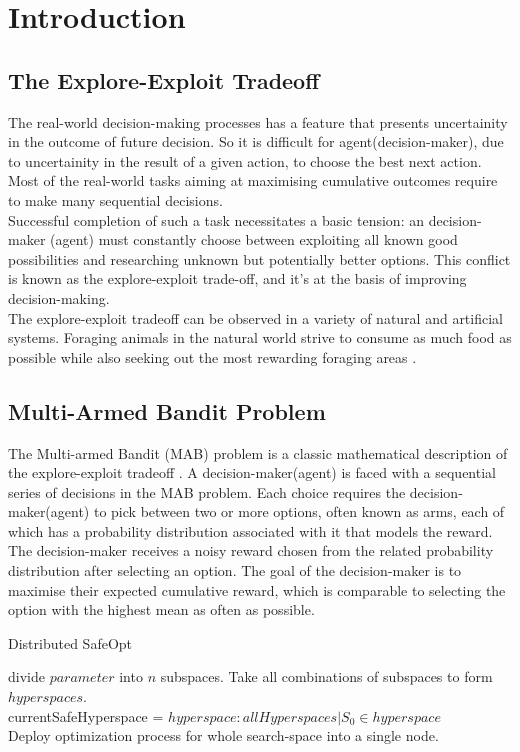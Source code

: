 \chapter{Introduction}\label{ch:introduction}
\section{The Explore-Exploit Tradeoff}
The real-world decision-making processes has a feature that presents uncertainity in the outcome of future decision. 
So it is difficult for agent(decision-maker), due to uncertainity in the result of a given action, to choose the best next action. 
Most of the real-world tasks aiming at maximising cumulative outcomes require to make many sequential decisions.\\
Successful completion of such a task necessitates a basic tension: an decision-maker (agent) must constantly choose between exploiting all 
known good possibilities and researching unknown but potentially better options. 
This conflict is known as the explore-exploit trade-off, and it's at the basis of improving decision-making.\\
The explore-exploit tradeoff can be observed in a variety of natural and artificial systems. 
Foraging animals in the natural world strive to consume as much food as possible while also seeking out the most rewarding foraging areas \cite{Keasar:2002}.

\section{Multi-Armed Bandit Problem}
The Multi-armed Bandit (MAB) problem is a classic mathematical description of the explore-exploit tradeoff \cite{Robbins:1952}. 
A decision-maker(agent) is faced with a sequential series of decisions in the MAB problem. 
Each choice requires the decision-maker(agent) to pick between two or more options, often known as arms, 
each of which has a probability distribution associated with it that models the reward. 
The decision-maker receives a noisy reward chosen from the related probability distribution after selecting an option. 
The goal of the decision-maker is to maximise their expected cumulative reward, 
which is comparable to selecting the option with the highest mean as often as possible.

\begin{algorithm}
	\SetAlgoVlined
	\caption{Distributed SafeOpt}
	{
		divide $parameter$ into $n$ subspaces.
	}
	Take all combinations of subspaces to form $hyperspaces$.\\
	currentSafeHyperspace = $hyperspace : allHyperspaces | S_0 \in hyperspace$\\
	Deploy optimization process for whole search-space into a single node.
\end{algorithm}

